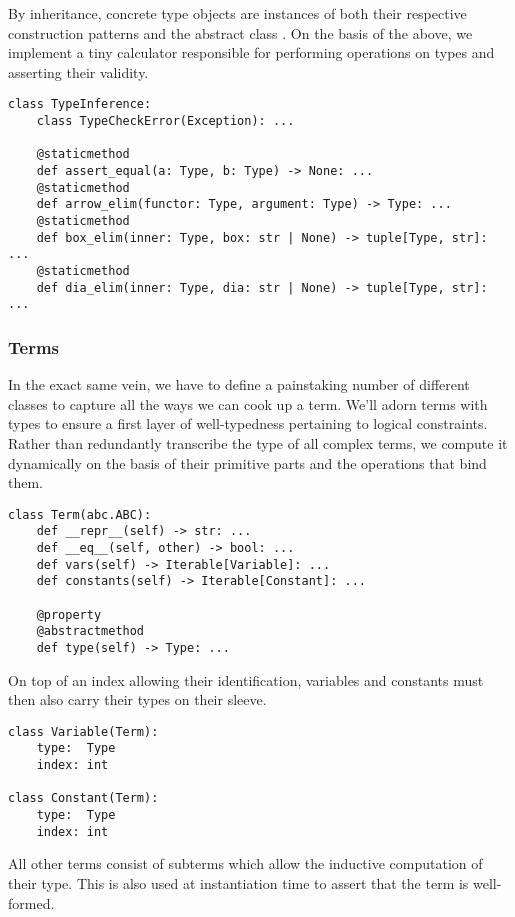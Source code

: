 \noindent By inheritance, concrete type objects are instances of both their respective construction patterns and the abstract class .
On the basis of the above, we implement a tiny calculator responsible for performing operations on types and asserting their validity.

\begin{verbatim}
class TypeInference:
    class TypeCheckError(Exception): ...

    @staticmethod
    def assert_equal(a: Type, b: Type) -> None: ...
    @staticmethod
    def arrow_elim(functor: Type, argument: Type) -> Type: ...
    @staticmethod
    def box_elim(inner: Type, box: str | None) -> tuple[Type, str]: ...
    @staticmethod
    def dia_elim(inner: Type, dia: str | None) -> tuple[Type, str]: ...
\end{verbatim}

\subsubsection{Terms}
In the exact same vein, we have to define a painstaking number of different classes to capture all the ways we can cook up a term.
We'll adorn terms with types to ensure a first layer of well-typedness pertaining to logical constraints.
Rather than redundantly transcribe the type of all complex terms, we compute it dynamically on the basis of their primitive parts and the operations that bind them.

\begin{verbatim}
class Term(abc.ABC):
    def __repr__(self) -> str: ...
    def __eq__(self, other) -> bool: ...
    def vars(self) -> Iterable[Variable]: ...
    def constants(self) -> Iterable[Constant]: ...

    @property
    @abstractmethod
    def type(self) -> Type: ...
\end{verbatim}

\noindent On top of an index allowing their identification, variables and constants must then also carry their types on their sleeve.

\begin{verbatim}
class Variable(Term):
    type:  Type
    index: int
    
class Constant(Term):
    type:  Type
    index: int
\end{verbatim}

\noindent All other terms consist of subterms which allow the inductive computation of their type.
This is also used at instantiation time to assert that the term is well-formed.

